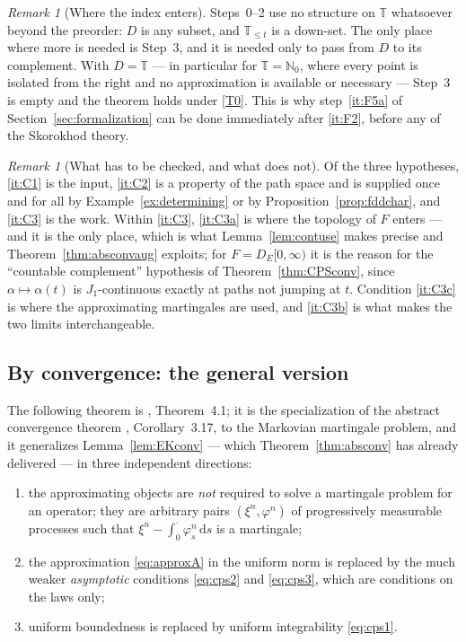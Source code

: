 \documentclass[11pt,a4paper]{article}
\theoremstyle{plain}
\theoremstyle{definition}
\theoremstyle{remark}
\newtheorem{remark}[theorem]{Remark}
\newcommand{\N}{\mathbb{N}}
\newcommand{\T}{\mathbb{T}}                     %
\newcommand{\DE}{D_E[0,\infty)}
\newcommand{\dif}{\,\mathrm{d}}
\newcommand{\CPS}{\cite{CPS23}}
\begin{document}
\begin{remark}[Where the index enters]
  \label{rem:absconvindex}
  Steps~0--2 use no structure on $\T$ whatsoever beyond the preorder: $D$ is any
  subset, and $\T_{\leq t}$ is a down-set.  The only place where more is needed is
  Step~3, and it is needed only to pass from $D$ to its complement.  With
  $D = \T$ --- in particular for $\T = \N_0$, where every point is isolated from
  the right and no approximation is available or necessary --- Step~3 is empty and
  the theorem holds under \eqref{T0}.  This is why step~\ref{it:F5a} of
  Section~\ref{sec:formalization} can be done immediately after \ref{it:F2},
  before any of the Skorokhod theory.
\end{remark}

\begin{remark}[What has to be checked, and what does not]
  \label{rem:absconvcheck}
  Of the three hypotheses, \ref{it:C1} is the input, \ref{it:C2} is a property of
  the path space and is supplied once and for all by
  Example~\ref{ex:determining} or by Proposition~\ref{prop:fddchar}, and
  \ref{it:C3} is the work.  Within \ref{it:C3}, \ref{it:C3a} is where the topology
  of $F$ enters --- and it is the only place, which is what
  Lemma~\ref{lem:contuse} makes precise and Theorem~\ref{thm:absconvaug}
  exploits; for $F = \DE$ it is the reason for the ``countable complement''
  hypothesis of Theorem~\ref{thm:CPSconv}, since
  $\alpha \mapsto \alpha(t)$ is $J_1$-continuous exactly at paths not jumping at
  $t$.  Condition \ref{it:C3c} is where the approximating martingales are used,
  and \ref{it:C3b} is what makes the two limits interchangeable.
\end{remark}

\subsection{By convergence: the general version}
\label{ssec:CPSconv}

The following theorem is \CPS, Theorem~4.1; it is the specialization of the
abstract convergence theorem \CPS, Corollary~3.17, to the Markovian martingale
problem, and it generalizes Lemma~\ref{lem:EKconv} --- which
Theorem~\ref{thm:absconv} has already delivered --- in three independent
directions:
\begin{enumerate}[label=(\arabic*)]
\item the approximating objects are \emph{not} required to solve a martingale
  problem for an operator; they are arbitrary pairs $(\xi^n,\varphi^n)$ of
  progressively measurable processes such that
  $\xi^n - \int_0^\cdot \varphi^n_s \dif s$ is a martingale;
\item the approximation \eqref{eq:approxA} in the uniform norm is replaced by
  the much weaker \emph{asymptotic} conditions \eqref{eq:cps2} and
  \eqref{eq:cps3}, which are conditions on the laws only;
\item uniform boundedness is replaced by uniform integrability
  \eqref{eq:cps1}.
\end{enumerate}
\end{document}
